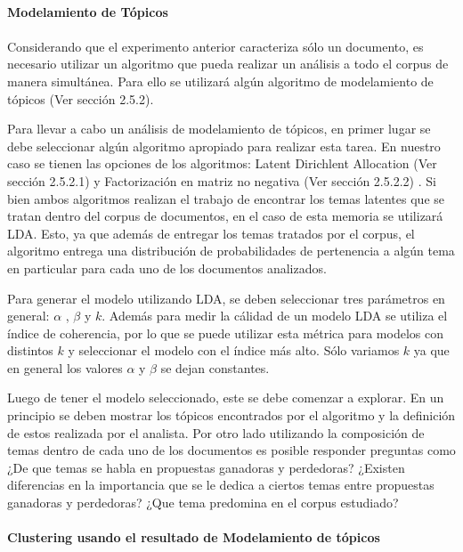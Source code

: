     \paragraph{Modelamiento de Tópicos}
    \paragraph*{}
    Considerando que el experimento anterior caracteriza sólo un documento, es necesario utilizar un algoritmo que pueda realizar un análisis a todo el corpus de manera simultánea. Para ello se utilizará algún algoritmo de modelamiento de tópicos (Ver sección 2.5.2).
    
    Para llevar a cabo un análisis de modelamiento de tópicos, en primer lugar se debe seleccionar algún algoritmo apropiado para realizar esta tarea. En nuestro caso se tienen las opciones de los algoritmos: Latent Dirichlent Allocation (Ver sección 2.5.2.1) y Factorización en matriz no negativa (Ver sección 2.5.2.2) . Si bien ambos algoritmos realizan el trabajo de encontrar los temas latentes que se tratan dentro del corpus de documentos, en el caso de esta memoria se utilizará LDA. Esto, ya que además de entregar los temas tratados por el corpus, el algoritmo entrega una distribución de probabilidades de pertenencia a algún tema en particular para cada uno de los documentos analizados.
    
    Para generar el modelo utilizando LDA, se deben seleccionar tres parámetros en general: $\alpha$ , $\beta$ y $k$. Además para medir la cálidad de un modelo LDA se utiliza el índice de coherencia, por lo que se puede utilizar esta métrica para modelos con distintos $k$ y seleccionar el modelo con el índice más alto. Sólo variamos $k$ ya que en general los valores $\alpha$ y $\beta$ se dejan constantes. 
    
    Luego de tener el modelo seleccionado, este se debe comenzar a explorar. En un principio se deben mostrar los tópicos encontrados por el algoritmo y la definición de estos realizada por el analista. Por otro lado utilizando la composición de temas dentro de cada uno de los documentos es posible responder preguntas como ¿De que temas se habla en propuestas ganadoras y perdedoras? ¿Existen diferencias en la importancia que se le dedica a ciertos temas entre propuestas ganadoras y perdedoras? ¿Que tema predomina en el corpus estudiado?
    
    \paragraph{Clustering usando el resultado de Modelamiento de tópicos}
